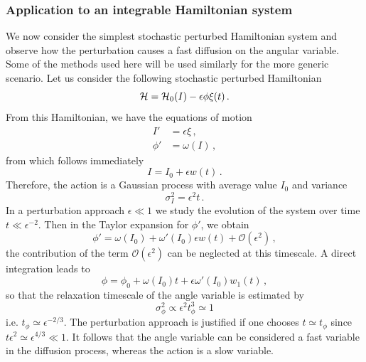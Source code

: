 \subsubsection*{Application to an integrable Hamiltonian system}

We now consider the simplest stochastic perturbed Hamiltonian system and observe how the perturbation causes a fast diffusion on the angular variable. Some of the methods used here will be used similarly for the more generic scenario. Let us consider the following stochastic perturbed Hamiltonian
\begin{equation}
	\mathcal{H} = \mathcal{H}_0(I) - \epsilon \phi \xi(t)\,.
\end{equation}
From this Hamiltonian, we have the equations of motion
\begin{equation}
	\begin{aligned}
		{I'} &= \epsilon\xi\,, \\
		{\phi'} &= \omega(I)\,,
	\end{aligned}
\end{equation}
from which follows immediately
\begin{equation}
	I = I_0 + \epsilon w(t)\,.
\end{equation}
Therefore, the action is a Gaussian process with average value $I_0$ and variance
\begin{equation}
	\sigma_{I}^2=\epsilon^2t\,.
\end{equation}
In a perturbation approach $\epsilon\ll 1$ we study the evolution of the system over time $t\ll \epsilon^{-2}$. Then in the Taylor expansion for \({\phi'}\), we obtain
\begin{equation}
	{\phi'} = \omega(I_0) + \omega'(I_0)\epsilon w(t) + \mathcal{O}(\epsilon^2)\,,
\end{equation}
the contribution of the term $\mathcal{O}(\epsilon^2)$ can be neglected at this timescale. A direct integration leads to
\begin{equation}
	\phi = \phi_0 + \omega(I_0)t + \epsilon \omega'(I_0) w_1(t)\,,
\end{equation}
so that the relaxation timescale of the angle variable is estimated by
\begin{equation}
	\sigma_{\phi}^2 \propto \epsilon^2 t_\phi^3\simeq 1
\end{equation}
i.e. $t_\phi\simeq \epsilon^{-2/3}$. The perturbation approach is justified if one chooses $t\simeq t_\phi$ since $t\epsilon^2\simeq \epsilon^{4/3}\ll 1$. It follows that the angle variable can be considered a fast variable in the diffusion process, whereas the action is a slow variable.

